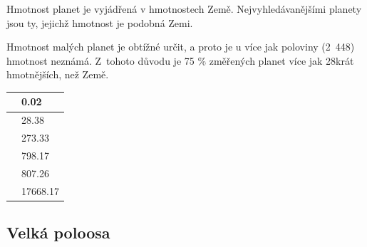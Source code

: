 \documentclass[a4paper,12pt]{article}
\begin{document}
\setlength{\columnsep}{0.43\textwidth}
\begin{multicols}{2}
\begin{minipage}{0.7\textwidth}
Hmotnost planet je vyjádřená v hmotnostech Země. Nejvyhledávanějšími planety jsou ty, jejichž hmotnost je podobná Zemi.

Hmotnost malých planet je obtížné určit, a proto je u více jak poloviny (2~448) hmotnost neznámá. Z~tohoto důvodu je 75 \% změřených planet více jak 28krát hmotnějších, než Země.
\end{minipage}
\begin{minipage}{0.3\textwidth}
\begin{tabular}{| l| l|}
   \hline
{\cellcolor[rgb]{0.85, 0.85, 0.85}{ Min }} & 0.02 \\ 
   \hline
{\cellcolor[rgb]{0.85, 0.85, 0.85}{ Qu1 }} & 28.38 \\ 
   \hline
{\cellcolor[rgb]{0.85, 0.85, 0.85}{ Median }} & 273.33 \\ 
   \hline
{\cellcolor[rgb]{0.85, 0.85, 0.85}{ Mean }} & 798.17 \\ 
   \hline
{\cellcolor[rgb]{0.85, 0.85, 0.85}{ Qu3 }} & 807.26 \\ 
   \hline
{\cellcolor[rgb]{0.85, 0.85, 0.85}{ Max }} & 17668.17 \\ 
   \hline
\end{tabular}\end{minipage}
\end{multicols}

\subsection{Velká poloosa}
\end{document}
